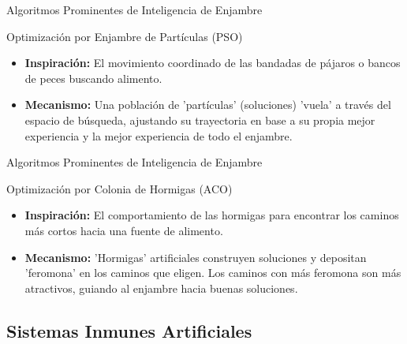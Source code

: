 \documentclass[aspectratio=169,xcolor=dvipsnames]{beamer}
\begin{document}
\begin{frame}{Algoritmos Prominentes de Inteligencia de Enjambre}

    \begin{block}{Optimización por Enjambre de Partículas (PSO)}
                \begin{itemize}
                    \item \textbf{Inspiración:} El movimiento coordinado de las bandadas de pájaros o bancos de peces buscando alimento.
                    \item \textbf{Mecanismo:} Una población de 'partículas' (soluciones) 'vuela' a través del espacio de búsqueda, ajustando su trayectoria en base a su propia mejor experiencia y la mejor experiencia de todo el enjambre.
                \end{itemize}
            \end{block}
\end{frame}
\begin{frame}{Algoritmos Prominentes de Inteligencia de Enjambre}
            \begin{alertblock}{Optimización por Colonia de Hormigas (ACO)}
                 \begin{itemize}
                    \item \textbf{Inspiración:} El comportamiento de las hormigas para encontrar los caminos más cortos hacia una fuente de alimento.
                    \item \textbf{Mecanismo:} 'Hormigas' artificiales construyen soluciones y depositan 'feromona' en los caminos que eligen. Los caminos con más feromona son más atractivos, guiando al enjambre hacia buenas soluciones.
                \end{itemize}
            \end{alertblock}
\end{frame}

\subsection{Sistemas Inmunes Artificiales}
\end{document}
